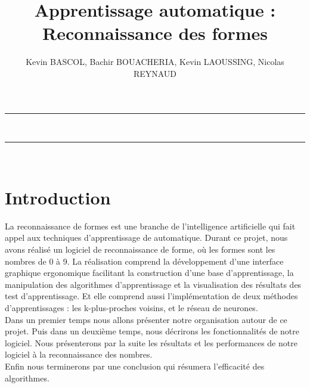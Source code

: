 \documentclass[10pt,a4paper]{report}
\author{Kevin BASCOL, Bachir BOUACHERIA, Kevin LAOUSSING, Nicolas REYNAUD}
\title{ Apprentissage automatique : Reconnaissance des formes}
\begin{document}
\makeatletter
	\begin{titlepage}
	
	\centering
		{
		\vspace*{5cm}
		\hrule height 2pt
		\vspace{0.7cm}
		\Huge \textbf{\@title}}\\
		\vspace{0.7cm}
		\hrule height 2pt
		
		\vfill
		\vspace{1cm}
		\@author\\
		\end{titlepage}
\makeatother
\setcounter{secnumdepth}{4}
\setcounter{tocdepth}{3}
\renewcommand{\contentsname}{Sommaire}
\begingroup\makeatletter
\def\@makeschapterhead#1{%
  {\parindent \z@ \raggedright
    \normalfont
    \interlinepenalty\@M
    \Huge \bfseries  #1\par\nobreak
    \vskip 20pt%
  }}\makeatother
\tableofcontents
\endgroup
\thispagestyle{empty}
\setcounter{page}{0}
\newpage


\section{Introduction}
\begin{flushleft}

La reconnaissance de formes est une branche de l'intelligence artificielle qui fait appel aux techniques d'apprentissage de automatique. Durant ce projet, nous avons réalisé un logiciel de reconnaissance de forme, où les formes sont les nombres de 0 à 9.
La réalisation comprend la développement d'une interface graphique ergonomique facilitant la construction d'une base d'apprentissage, la manipulation des algorithmes d'apprentissage et la visualisation des résultats des test d'apprentissage. Et elle comprend aussi l'implémentation de deux méthodes d'apprentissages : les k-plus-proches voisins, et le réseau de neurones.\\
Dans un premier temps nous allons présenter notre organisation autour de ce projet. Puis dans un deuxième temps, nous décrirons les fonctionnalités de notre logiciel. Nous présenterons par la suite les résultats et les performances de notre logiciel à la reconnaissance des nombres.\\
Enfin nous terminerons par une conclusion qui résumera l'efficacité des algorithmes.


\end{flushleft}
\end{document}
